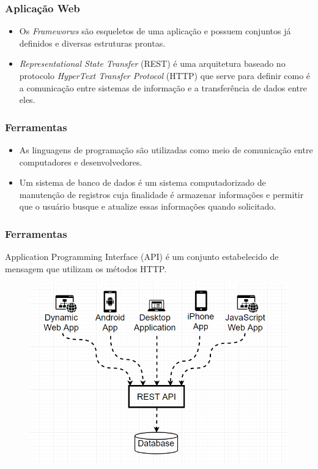 \documentclass{beamer}
\begin{document}
	\begin{frame}\frametitle{Aplicação Web}
		\begin{itemize}
			\item Os \textit{Frameworws} são esqueletos de uma aplicação e possuem conjuntos já definidos e diversas estruturas prontas.
			\item \textit{Representational State Transfer} (REST) é uma arquitetura baseado no protocolo \textit{HyperText Transfer Protocol} (HTTP) que serve para definir como é a comunicação entre sistemas de informação e a transferência de dados entre eles.
		\end{itemize}
	\end{frame}


	\begin{frame}\frametitle{Ferramentas}
		\begin{itemize}
			\item As linguagens de programação são utilizadas como meio de comunicação entre computadores e desenvolvedores.
			\item Um sistema de banco de dados é um sistema computadorizado de manutenção de registros cuja finalidade é armazenar informações e permitir que o usuário busque e atualize essas informações quando solicitado.
		\end{itemize}
	\end{frame}

	\begin{frame}\frametitle{Ferramentas}
		Application Programming Interface (API) é um conjunto estabelecido de mensagem que utilizam os métodos HTTP.
			\begin{figure}[ht]
				\centering
				\includegraphics[scale=0.3]{img/rest_api.png}
			\end{figure}
	\end{frame}
\end{document}
